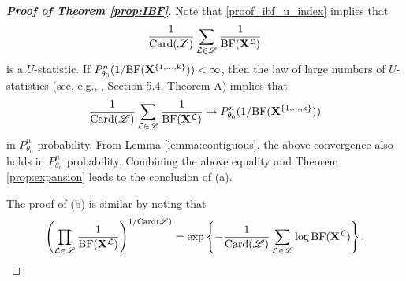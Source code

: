 \documentclass[11pt]{article}
\theoremstyle{plain}
\theoremstyle{definition}
\theoremstyle{remark}
\begin{document}
\begin{appendices}
\begin{proof} [\textbf{Proof of Theorem \ref{prop:IBF}}]
    Note that \eqref{proof_ibf_u_index} implies that
    \begin{align*}
    \frac{1}{\text{Card}(\mathscr L)} \sum_{\mathcal L \in \mathscr L} \frac{1}{ \text{BF}(\mathbf{X}^{\mathcal L}) }
    \end{align*}
    is a $U$-statistic.
    If $P_{\theta_0}^n ( 1 / \rm{BF}(\mathbf{X}^{\{1,\dots,k\}}) ) < \infty$, then the law of large numbers of $U$-statistics (see, e.g., \cite{Serfling1980App}, Section 5.4, Theorem A) implies that
    \begin{align*}
    \frac{1}{\text{Card}(\mathscr L)} \sum_{\mathcal L \in \mathscr L} \frac{1}{ \text{BF}(\mathbf{X}^{\mathcal L}) }
    \to 
    P_{\theta_0}^n ( 1 / \rm{BF}(\mathbf{X}^{\{1,\dots,k\}}) ) 
    \end{align*}
    in $P_{\theta_0}^n$ probability.
    From Lemma \ref{lemma:contiguous}, the above convergence also holds in $P_{\theta_n}^n$ probability.
    Combining the above equality and Theorem \ref{prop:expansion} leads to the conclusion of (a).

    The proof of (b) is similar by noting that
    \begin{align*}
        \left(\prod_{\mathcal L \in \mathscr L} \frac{1}{ \text{BF}(\mathbf{X}^{\mathcal L}) } \right)^{1/\text{Card}(\mathscr L)}
        =
        \exp\left\{
            -
            \frac{1}{\text{Card}(\mathscr L)}
            \sum_{\mathcal L \in \mathscr L} \log \text{BF}(\mathbf{X}^{\mathcal L})
        \right\}
        .
    \end{align*}
    
\end{proof}







\end{appendices}




\end{document}
